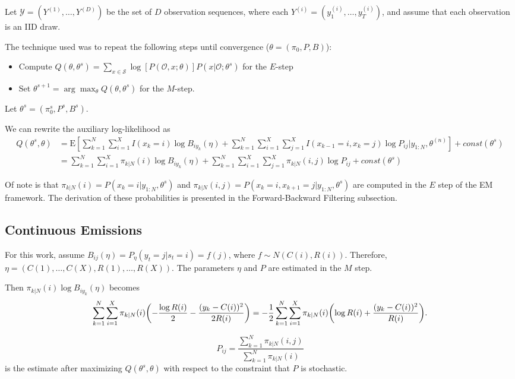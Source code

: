 \documentclass[english]{article}
\numberwithin{equation}{section}
\newcommand{\E}{\mathrm{E}}
\DeclarePairedDelimiter\paren{(}{)}           %
\begin{document}
	Let $\mathcal{Y} = (Y^{(1)},\ldots,Y^{(D)})$ be the set of $D$ observation sequences, where each $Y^{(i)}=(y_1^{(i)},\ldots,y_{T}^{(i)})$, and assume that each observation is an IID draw.

	The technique used was to repeat the following steps until convergence ($\theta = (\pi_0,P,B)$):
	\begin{itemize}
		\item Compute $Q(\theta,\theta^s) = \sum_{x\in \mathcal{S}} \log [P(\mathcal{O},x;\theta)]P(x|\mathcal{O};\theta^s)$ for the $E$-step
		\item Set $\theta^{s+1} = \arg \max_{\theta} Q(\theta, \theta^s)$ for the $M$-step.
	\end{itemize}
	
	Let $\theta^s = (\pi_0^s,P^s,B^s)$. 
	
	We can rewrite the auxiliary log-likelihood as
	\begin{align*}
	Q(\theta^{s},\theta) &= \E\left[ \sum_{k=1}^N \sum_{i=1}^X I(x_k=i) \log B_{iy_k}(\eta) + \sum_{k=1}^N \sum_{i=1}^X \sum_{j=1}^X I(x_{k-1}=i,x_k=j) \log P_{ij} | y_{1:N},\theta^{(n)}\right] + const(\theta^{s}) \\
	&= \sum_{k=1}^N \sum_{i=1}^X \pi_{k|N}(i)\log B_{iy_k}(\eta) + \sum_{k=1}^N \sum_{i=1}^X \sum_{j=1}^X \pi_{k|N}(i,j)\log P_{ij} + const(\theta^s)
	\end{align*}
	
	Of note is that $\pi_{k|N}(i)=P(x_k=i|y_{1:N},\theta^s)$ and $\pi_{k|N}(i,j)=P(x_k=i,x_{k+1}=j|y_{1:N},\theta^s)$ are computed in the $E$ step of the EM framework. The derivation of these probabilities is presented in the Forward-Backward Filtering subsection.
	
	\subsection*{Continuous Emissions}
	
	For this work, assume $B_{ij}(\eta) = P_{\eta}(y_t=j|s_t=i) = f(j)$, where $f\sim N(C(i),R(i))$. Therefore, $\eta=(C(1),\ldots,C(X),R(1),\ldots,R(X))$. The parameters $\eta$ and $P$ are estimated in the $M$ step.
	
	Then $\pi_{k|N}(i)\log B_{iy_k}(\eta)$ becomes
	$$
	\sum_{k=1}^N \sum_{i=1}^X \pi_{k|N}(i)\paren*{-\frac{\log R(i)}{2}-\frac{(y_k-C(i))^2}{2R(i)}}=-\frac{1}{2}\sum_{k=1}^N \sum_{i=1}^X \pi_{k|N}(i)\paren*{\log R(i)+\frac{(y_k-C(i))^2}{R(i)}}.
	$$
		
	$$P_{ij}=\frac{\sum_{k=1}^N \pi_{k|N}(i,j)}{\sum_{k=1}^N \pi_{k|N}(i)}$$ is the estimate after maximizing $Q(\theta^{s},\theta)$ with respect to the constraint that $P$ is stochastic.
	
\end{document}
